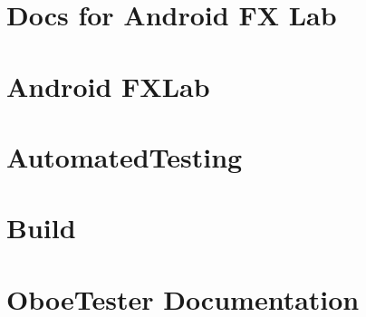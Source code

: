\let\mypdfximage\pdfximage\def\pdfximage{\immediate\mypdfximage}\documentclass[twoside]{book}
\newcommand{\+}{\discretionary{\mbox{\scriptsize$\hookleftarrow$}}{}{}}
\begin{document}
\chapter{Docs for Android FX Lab}
\label{md__c_1__users_fab_src__github_branches__neural_amp_modeler_plugin_i_plug2__dependencies__build_7ea3e3941fcaab567957cba6beb21bca}

\chapter{Android F\+X\+Lab}
\label{md__c_1__users_fab_src__github_branches__neural_amp_modeler_plugin_i_plug2__dependencies__build_19c92522fd36f4a2f85c8b77040ea05c}

\chapter{Automated\+Testing}
\label{md__c_1__users_fab_src__github_branches__neural_amp_modeler_plugin_i_plug2__dependencies__build_38c90ad72c710823aab99c67df60f6c1}

\chapter{Build}
\label{md__c_1__users_fab_src__github_branches__neural_amp_modeler_plugin_i_plug2__dependencies__build_cdfa0dc099d7c081d7783adc742bda11}

\chapter{Oboe\+Tester Documentation}
\label{md__c_1__users_fab_src__github_branches__neural_amp_modeler_plugin_i_plug2__dependencies__build_771b3ec68a16034042fd3adcf72edd44}

\end{document}
